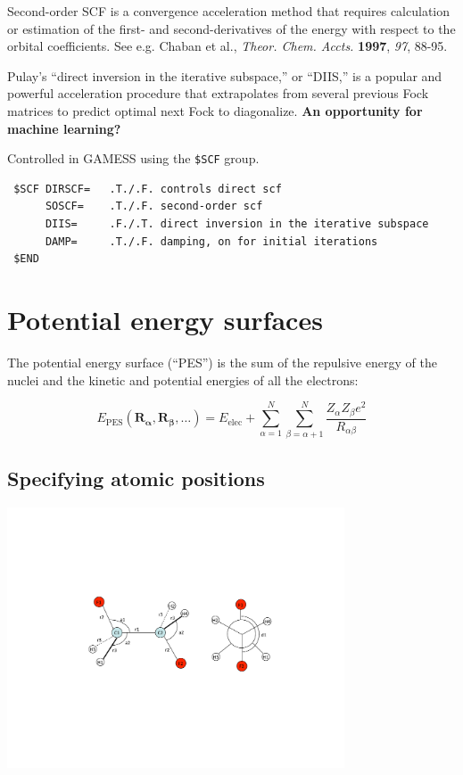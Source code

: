 \documentclass[11pt]{article}
\begin{document}
Second-order SCF is a convergence acceleration method that requires calculation or estimation of the first- and second-derivatives of the energy with respect to the orbital coefficients. See e.g. Chaban et al., \emph{Theor. Chem. Accts.} \textbf{1997}, \emph{97}, 88-95.

Pulay's ``direct inversion in the iterative subspace,'' or ``DIIS,'' is a popular and powerful acceleration procedure that extrapolates from several previous Fock matrices to predict optimal next Fock to diagonalize. \textbf{An opportunity for machine learning?} 

Controlled in GAMESS using the \texttt{\$SCF} group.

\begin{verbatim}
 $SCF DIRSCF=   .T./.F. controls direct scf
      SOSCF=    .T./.F. second-order scf
      DIIS=     .F./.T. direct inversion in the iterative subspace
      DAMP=     .T./.F. damping, on for initial iterations
 $END
\end{verbatim}
\newpage
\section{Potential energy surfaces}
\label{sec:org8f2f969}
The potential energy surface (``PES'') is the sum of the repulsive energy of the nuclei and the kinetic and potential energies of all the electrons:
\begin{center}
\begin{equation}
E_\text{PES}(\mathbf{R_\alpha},\mathbf{R_\beta},\ldots) =E_\text{elec} +\sum_{\alpha=1}^N \sum_{\beta =\alpha +1}^N \frac{Z_\alpha Z_\beta e^2}{R_{\alpha \beta}}
\end{equation}
\end{center}

\subsection{Specifying atomic positions}
\label{sec:orgedcb70c}

\begin{center}
\begin{center}
\includegraphics[width=0.75\textwidth]{./Images/Internals.pdf}
\end{center}
\end{center}
\end{document}
